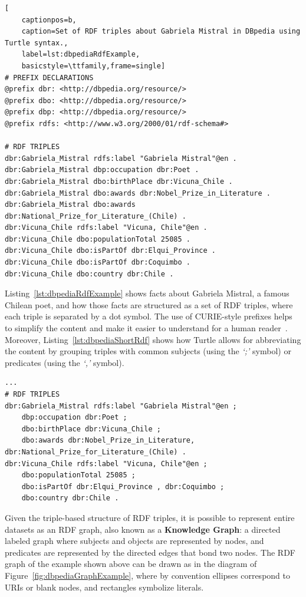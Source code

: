 \begin{lstlisting}[
    captionpos=b, 
    caption=Set of RDF triples about Gabriela Mistral in DBpedia using Turtle syntax.,
    label=lst:dbpediaRdfExample,
    basicstyle=\ttfamily,frame=single]
# PREFIX DECLARATIONS
@prefix dbr: <http://dbpedia.org/resource/>
@prefix dbo: <http://dbpedia.org/resource/>
@prefix dbp: <http://dbpedia.org/resource/>
@prefix rdfs: <http://www.w3.org/2000/01/rdf-schema#>

# RDF TRIPLES
dbr:Gabriela_Mistral rdfs:label "Gabriela Mistral"@en .
dbr:Gabriela_Mistral dbp:occupation dbr:Poet .
dbr:Gabriela_Mistral dbo:birthPlace dbr:Vicuna_Chile .
dbr:Gabriela_Mistral dbo:awards dbr:Nobel_Prize_in_Literature .
dbr:Gabriela_Mistral dbo:awards dbr:National_Prize_for_Literature_(Chile) .
dbr:Vicuna_Chile rdfs:label "Vicuna, Chile"@en .
dbr:Vicuna_Chile dbo:populationTotal 25085 .
dbr:Vicuna_Chile dbo:isPartOf dbr:Elqui_Province .
dbr:Vicuna_Chile dbo:isPartOf dbr:Coquimbo .
dbr:Vicuna_Chile dbo:country dbr:Chile .
\end{lstlisting}

Listing~\ref{lst:dbpediaRdfExample} shows facts about Gabriela Mistral, a famous Chilean poet, 
and how those facts are structured as a set of RDF triples, where each triple is separated by a 
dot symbol. The use of CURIE-style prefixes helps to simplify the content and make it easier to 
understand for a human reader~\cite{key:prefixes}. Moreover, Listing~\ref{lst:dbpediaShortRdf} 
shows how Turtle allows for abbreviating the content by grouping triples with common subjects 
(using the \textit{‘;’} symbol) or predicates (using the \textit{‘,’} symbol).

\begin{lstlisting}[captionpos=b, 
    caption=Set of RDF abbreviated triples about Gabriela Mistral in DBpedia., 
    label=lst:dbpediaShortRdf,
    basicstyle=\ttfamily,frame=single]
...
# RDF TRIPLES
dbr:Gabriela_Mistral rdfs:label "Gabriela Mistral"@en ;
    dbp:occupation dbr:Poet ;
    dbo:birthPlace dbr:Vicuna_Chile ;
    dbo:awards dbr:Nobel_Prize_in_Literature, dbr:National_Prize_for_Literature_(Chile) .
dbr:Vicuna_Chile rdfs:label "Vicuna, Chile"@en ;
    dbo:populationTotal 25085 ;
    dbo:isPartOf dbr:Elqui_Province , dbr:Coquimbo ;
    dbo:country dbr:Chile .
\end{lstlisting}

Given the triple-based structure of RDF triples, it is possible to represent entire 
datasets as an RDF graph, also known as a \textbf{Knowledge Graph}: a directed labeled 
graph where subjects and objects are represented by nodes, and predicates are represented 
by the directed edges that bond two nodes. The RDF graph of the example shown above can be 
drawn as in the diagram of Figure~\ref{fig:dbpediaGraphExample}, where by convention 
ellipses correspond to URIs or blank nodes, and rectangles symbolize literals.

